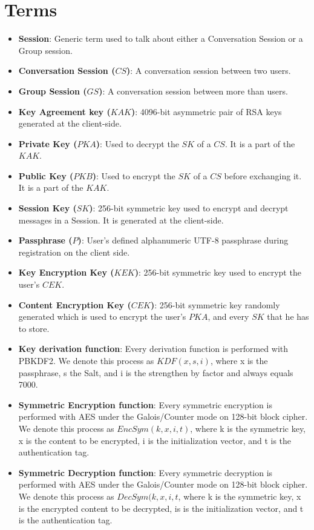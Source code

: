\documentclass[a4paper,10pt]{article}
\begin{document}
\section{Terms}
\begin{itemize}
    \item \textbf{Session}:
    Generic term used to talk about either a Conversation Session or a Group session.
    \item \textbf{Conversation Session ($CS$)}:
    A conversation session between two users.
    \item \textbf{Group Session ($GS$)}:
    A conversation session between more than users.
    \item \textbf{Key Agreement key ($KAK$)}:
    4096-bit asymmetric pair of RSA keys generated at the client-side.
    \item \textbf{Private Key ($PKA$)}:
    Used to decrypt the $SK$ of a $CS$. It is a part of the $KAK$.
    \item \textbf{Public Key ($PKB$)}:
    Used to encrypt the $SK$ of a $CS$ before exchanging it. It is a part of the $KAK$.
    \item \textbf{Session Key ($SK$)}:
    256-bit symmetric key used to encrypt and decrypt messages in a Session. It is generated at the client-side.
    \item \textbf{Passphrase ($P$)}:
    User's defined alphanumeric UTF-8 passphrase during registration on the client side.
    \item \textbf{Key Encryption Key ($KEK$)}:
    256-bit symmetric key used to encrypt the user's $CEK$.
    \item \textbf{Content Encryption Key ($CEK$)}:
    256-bit symmetric key randomly generated which is used to encrypt the user's $PKA$, and every $SK$ that he has to store.
    \item \textbf{Key derivation function}:
    Every derivation function is performed with PBKDF2. We denote this process as $KDF(x, s, i)$, where x is the passphrase, s the Salt, and i is the strengthen by factor and always equals 7000.
    \item \textbf{Symmetric Encryption function}:
    Every symmetric encryption is performed with AES under the Galois/Counter mode on 128-bit block cipher. We denote this process as $EncSym(k, x, i, t)$, where k is the symmetric key, x is the content to be encrypted, i is the initialization vector, and t is the authentication tag.
    \item \textbf{Symmetric Decryption function}:
    Every symmetric decryption is performed with AES under the Galois/Counter mode on 128-bit block cipher. We denote this process as $DecSym(k, x, i, t$, where k is the symmetric key, x is the encrypted content to be decrypted, is is the initialization vector, and t is the authentication tag.

\end{itemize}
\end{document}

